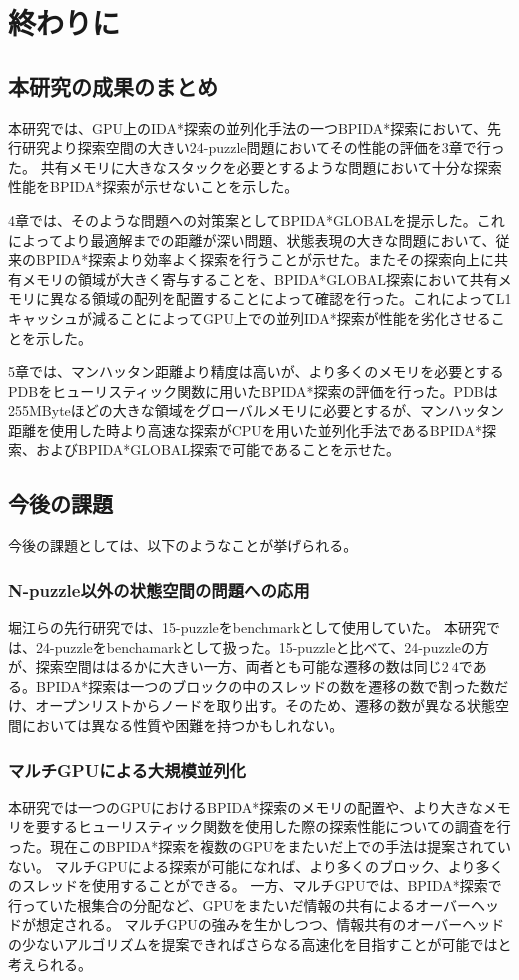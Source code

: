 \documentclass[a4paper,11pt,oneside,openany]{jsbook}
\begin{document}
\chapter{終わりに}
\section{本研究の成果のまとめ}
本研究では、GPU上のIDA*探索の並列化手法の一つBPIDA*探索において、先行研究\cite{HA17}より探索空間の大きい24-puzzle問題においてその性能の評価を3章で行った。
共有メモリに大きなスタックを必要とするような問題において十分な探索性能をBPIDA*探索が示せないことを示した。

4章では、そのような問題への対策案としてBPIDA*GLOBALを提示した。これによってより最適解までの距離が深い問題、状態表現の大きな問題において、従来のBPIDA*探索より効率よく探索を行うことが示せた。またその探索向上に共有メモリの領域が大きく寄与することを、BPIDA*GLOBAL探索において共有メモリに異なる領域の配列を配置することによって確認を行った。これによってL1キャッシュが減ることによってGPU上での並列IDA*探索が性能を劣化させることを示した。

5章では、マンハッタン距離より精度は高いが、より多くのメモリを必要とするPDBをヒューリスティック関数に用いたBPIDA*探索の評価を行った。PDBは255MByteほどの大きな領域をグローバルメモリに必要とするが、マンハッタン距離を使用した時より高速な探索がCPUを用いた並列化手法であるBPIDA*探索、およびBPIDA*GLOBAL探索で可能であることを示せた。

\section{今後の課題}
今後の課題としては、以下のようなことが挙げられる。

\subsection{N-puzzle以外の状態空間の問題への応用}
堀江らの先行研究\cite{HA17}では、15-puzzleをbenchmarkとして使用していた。
本研究では、24-puzzleをbenchamarkとして扱った。15-puzzleと比べて、24-puzzleの方が、探索空間ははるかに大きい一方、両者とも可能な遷移の数は同じ$2~4$である。BPIDA*探索は一つのブロックの中のスレッドの数を遷移の数で割った数だけ、オープンリストからノードを取り出す。そのため、遷移の数が異なる状態空間においては異なる性質や困難を持つかもしれない。


\subsection{マルチGPUによる大規模並列化}
本研究では一つのGPUにおけるBPIDA*探索のメモリの配置や、より大きなメモリを要するヒューリスティック関数を使用した際の探索性能についての調査を行った。現在このBPIDA*探索を複数のGPUをまたいだ上での手法は提案されていない。
マルチGPUによる探索が可能になれば、より多くのブロック、より多くのスレッドを使用することができる。
一方、マルチGPUでは、BPIDA*探索で行っていた根集合の分配など、GPUをまたいだ情報の共有によるオーバーヘッドが想定される。
マルチGPUの強みを生かしつつ、情報共有のオーバーヘッドの少ないアルゴリズムを提案できればさらなる高速化を目指すことが可能ではと考えられる。
\end{document}
